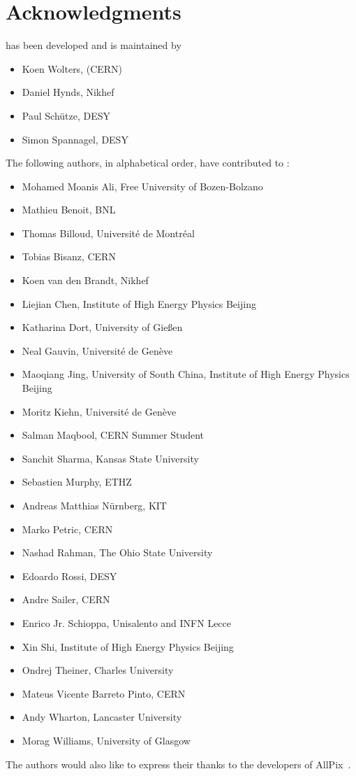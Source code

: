 \chapter{Acknowledgments}

\apsq has been developed and is maintained by

\begin{itemize}
\item Koen Wolters, (CERN)
\item Daniel Hynds, Nikhef
\item Paul Schütze, DESY
\item Simon Spannagel, DESY
\end{itemize}

The following authors, in alphabetical order, have contributed to \apsq:

\begin{itemize}
\item Mohamed Moanis Ali, Free University of Bozen-Bolzano
\item Mathieu Benoit, BNL
\item Thomas Billoud, Université de Montréal
\item Tobias Bisanz, CERN
\item Koen van den Brandt, Nikhef
\item Liejian Chen, Institute of High Energy Physics Beijing
\item Katharina Dort, University of Gie\ss en
\item Neal Gauvin, Université de Genève
\item Maoqiang Jing, University of South China, Institute of High Energy Physics Beijing
\item Moritz Kiehn, Université de Genève
\item Salman Maqbool, CERN Summer Student
\item Sanchit Sharma, Kansas State University
\item Sebastien Murphy, ETHZ
\item Andreas Matthias Nürnberg, KIT
\item Marko Petric, CERN
\item Nashad Rahman, The Ohio State University
\item Edoardo Rossi, DESY
\item Andre Sailer, CERN
\item Enrico Jr. Schioppa, Unisalento and INFN Lecce
\item Xin Shi, Institute of High Energy Physics Beijing
\item Ondrej Theiner, Charles University
\item Mateus Vicente Barreto Pinto, CERN
\item Andy Wharton, Lancaster University
\item Morag Williams, University of Glasgow
\end{itemize}

The authors would also like to express their thanks to the developers of AllPix~\cite{ap1wiki,ap1git}.
